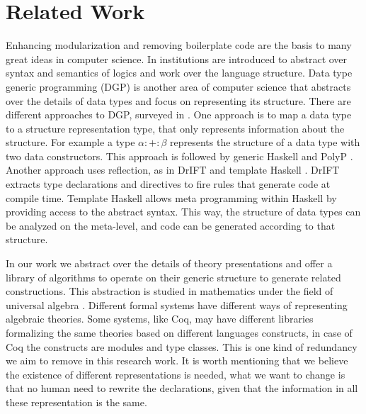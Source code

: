 
\section{Related Work}
\label{sec:related_work}

Enhancing modularization and removing boilerplate code are the basis to many great ideas in computer 
science. 
In \cite{Goguen1984Institutions} institutions are introduced to abstract over syntax and semantics of 
logics and work over the language structure. 
Data type generic programming (DGP) \cite{Gibbons2007DGP} is another area of computer science that abstracts over the details of data types and focus on representing its structure. There are different approaches to DGP, surveyed in \cite{hinze2007comparing}. One approach is to map a data type to a structure representation type, that only represents information about the structure. For example a type  $\alpha :+: \beta$ represents the structure of a data type with two data constructors. This approach is followed by generic Haskell \cite{Hinze2003GenericHs} and PolyP \cite{Jansson1997PolyP}. 
Another approach uses reflection, as in DrIFT \cite{winstanley1997type} and template Haskell \cite{Norell2004TemplateHs}. DrIFT extracts type declarations and directives to fire rules that generate code at compile time. Template Haskell allows meta programming within Haskell by providing access to the abstract syntax. This way, the structure of data types can be analyzed on the meta-level, and code can be generated according to that structure. 

In our work we abstract over the details of theory presentations and offer a library of algorithms to 
operate on their generic structure to generate related constructions. This abstraction is studied in 
mathematics under the field of universal algebra \cite{wechler1992universal}. Different formal systems 
have different ways of representing algebraic theories. Some systems, like Coq, may have different 
libraries formalizing the same theories based on different languages constructs, in case of Coq the 
constructs are modules and type classes. This is one kind of redundancy we aim to remove in this 
research work. It is worth mentioning that we believe the existence of different representations is 
needed, what we want to change is that no human need to rewrite the declarations, given that the 
information in all these representation is the same. 

